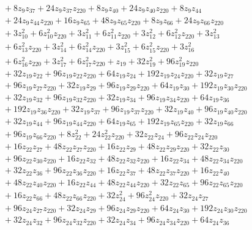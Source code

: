 \documentclass[11pt]{article}
\theoremstyle{remark}
\begin{document}
\begin{align*}
&\quad{}+8z_{9} z_{37}+24z_{9} z_{37} z_{220}+8z_{9} z_{40}+24z_{9} z_{40} z_{220}+8z_{9} z_{44}\\
&\quad{}+24z_{9} z_{44} z_{220}+16z_{9} z_{65}+48z_{9} z_{65} z_{220}+8z_{9} z_{66}+24z_{9} z_{66} z_{220}\\
&\quad{}+3z_{10}^{2}+6z_{10}^{2} z_{220}+3z_{11}^{2}+6z_{11}^{2} z_{220}+3z_{12}^{2}+6z_{12}^{2} z_{220}+3z_{13}^{2}\\
&\quad{}+6z_{13}^{2} z_{220}+3z_{14}^{2}+6z_{14}^{2} z_{220}+3z_{15}^{2}+6z_{15}^{2} z_{220}+3z_{16}^{2}\\
&\quad{}+6z_{16}^{2} z_{220}+3z_{17}^{2}+6z_{17}^{2} z_{220}+z_{19}+32z_{19}^{2}+96z_{19}^{2} z_{220}\\
&\quad{}+32z_{19} z_{22}+96z_{19} z_{22} z_{220}+64z_{19} z_{24}+192z_{19} z_{24} z_{220}+32z_{19} z_{27}\\
&\quad{}+96z_{19} z_{27} z_{220}+32z_{19} z_{29}+96z_{19} z_{29} z_{220}+64z_{19} z_{30}+192z_{19} z_{30} z_{220}\\
&\quad{}+32z_{19} z_{32}+96z_{19} z_{32} z_{220}+32z_{19} z_{34}+96z_{19} z_{34} z_{220}+64z_{19} z_{36}\\
&\quad{}+192z_{19} z_{36} z_{220}+32z_{19} z_{37}+96z_{19} z_{37} z_{220}+32z_{19} z_{40}+96z_{19} z_{40} z_{220}\\
&\quad{}+32z_{19} z_{44}+96z_{19} z_{44} z_{220}+64z_{19} z_{65}+192z_{19} z_{65} z_{220}+32z_{19} z_{66}\\
&\quad{}+96z_{19} z_{66} z_{220}+8z_{22}^{2}+24z_{22}^{2} z_{220}+32z_{22} z_{24}+96z_{22} z_{24} z_{220}\\
&\quad{}+16z_{22} z_{27}+48z_{22} z_{27} z_{220}+16z_{22} z_{29}+48z_{22} z_{29} z_{220}+32z_{22} z_{30}\\
&\quad{}+96z_{22} z_{30} z_{220}+16z_{22} z_{32}+48z_{22} z_{32} z_{220}+16z_{22} z_{34}+48z_{22} z_{34} z_{220}\\
&\quad{}+32z_{22} z_{36}+96z_{22} z_{36} z_{220}+16z_{22} z_{37}+48z_{22} z_{37} z_{220}+16z_{22} z_{40}\\
&\quad{}+48z_{22} z_{40} z_{220}+16z_{22} z_{44}+48z_{22} z_{44} z_{220}+32z_{22} z_{65}+96z_{22} z_{65} z_{220}\\
&\quad{}+16z_{22} z_{66}+48z_{22} z_{66} z_{220}+32z_{24}^{2}+96z_{24}^{2} z_{220}+32z_{24} z_{27}\\
&\quad{}+96z_{24} z_{27} z_{220}+32z_{24} z_{29}+96z_{24} z_{29} z_{220}+64z_{24} z_{30}+192z_{24} z_{30} z_{220}\\
&\quad{}+32z_{24} z_{32}+96z_{24} z_{32} z_{220}+32z_{24} z_{34}+96z_{24} z_{34} z_{220}+64z_{24} z_{36}\\

\end{align*}
\end{document}
